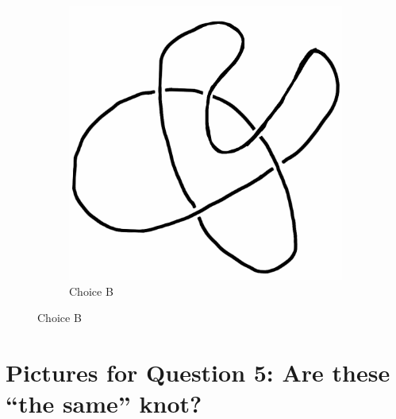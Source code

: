 \documentclass[12pt,letterpaper]{article}
\theoremstyle{definition}
\begin{document}
\begin{figure}[h!]
\begin{subfigure}[b]{0.4\textwidth}
        \includegraphics[width=\textwidth]{knotpics/9SeptQ4b.png}
        \caption{Choice B}
    \end{subfigure}
\end{figure}

\clearpage

\section*{Pictures for Question 5: Are these ``the same'' knot?}
\end{document}

